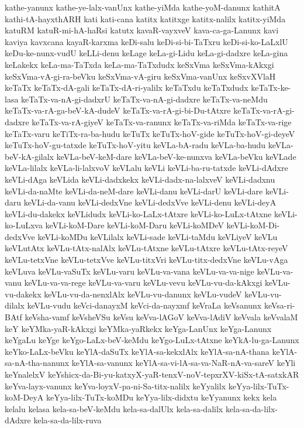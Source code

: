 {kathe-yanunx
kathe-ye-lalx-vanUnx
kathe-yiMda
kathe-yoM-danunx
kathitA
kathi-tA-hayxthARH
kati
kati-cana
katitx
katitxge
katitx-nalilx
katitx-yiMda
katuRM
katuR-mi-hA-haRsi
katutx
kavaR-vayxveV
kava-ca-ga-Lanunx
kavi
kaviya
kavxcana
kayaR-karxma
keDi-salu
keDi-si-bi-TaTxru
keDi-si-ko-LaLxlU
keDu-ke-nunx-vudU
keLLi-denu
keLage
keLa-gi-Lidu
keLa-gi-dadxre
keLa-gina
keLakekx
keLa-ma-TaTxda
keLa-ma-TaTxdudx
keSxVma
keSxVma-kAkxgi
keSxVma-vA-gi-ra-beVku
keSxVma-vA-giru
keSxVma-vanUnx
keSxvXVlaH
keTaTx
keTaTx-dA-gali
keTaTx-dA-ri-yalilx
keTaTxdu
keTaTxdudx
keTaTx-ke-lasa
keTaTx-va-nA-gi-dadxrU
keTaTx-va-nA-gi-dadxre
keTaTx-va-neMdu
keTaTx-va-rA-ga-beV-kA-dudeV
keTaTx-va-rA-gi-bi-Du-tAtxre
keTaTx-va-rA-gi-dadxre
keTaTx-va-rA-giyeV
keTaTx-va-ranunx
keTaTx-va-riMda
keTaTx-va-rige
keTaTx-varu
keTiTx-ra-ba-hudu
keTuTx
keTuTx-hoV-gide
keTuTx-hoV-gi-deyeV
keTuTx-hoV-gu-tatxde
keTuTx-hoV-yitu
keVLa-bA-radu
keVLa-ba-hudu
keVLa-beV-kA-gilalx
keVLa-beV-keM-dare
keVLa-beV-ke-nunxva
keVLa-beVku
keVLade
keVLa-lilalx
keVLa-li-lalxvoV
keVLalu
keVLi
keVLi-ba-ru-tatxde
keVLi-dAdxre
keVLi-dAga
keVLida
keVLi-dadxkekx
keVLi-dadx-na-lalxveV
keVLi-dadxnu
keVLi-da-naMte
keVLi-da-neM-dare
keVLi-danu
keVLi-darU
keVLi-dare
keVLi-daru
keVLi-da-vanu
keVLi-dedxVne
keVLi-dedxVve
keVLi-denu
keVLi-deyA
keVLi-du-dakekx
keVLidudx
keVLi-ko-LaLx-tAtxre
keVLi-ko-LuLx-tAtxne
keVLi-ko-LuLxva
keVLi-koM-Dare
keVLi-koM-Daru
keVLi-koMDeV
keVLi-koM-Di-dedxVve
keVLi-koMDu
keVLilalx
keVLi-sade
keVLi-taMdu
keVLiyeV
keVLu
keVLutAtx
keVLu-tAtx-nalAlx
keVLu-tAtxne
keVLu-tAtxre
keVLu-tAtx-reyeV
keVLu-tetxVne
keVLu-tetxVve
keVLu-titxVri
keVLu-titx-dedxVne
keVLu-vAga
keVLuva
keVLu-vaSuTx
keVLu-varu
keVLu-va-vana
keVLu-va-va-nige
keVLu-va-vanu
keVLu-va-va-rege
keVLu-va-varu
keVLu-vevu
keVLu-vu-da-kAkxgi
keVLu-vu-dakekx
keVLu-vu-da-nenxlAlx
keVLu-vu-danunx
keVLu-vudeV
keVLu-vu-dilalx
keVLu-vudu
keVci-danayxM
keVci-da-nayxmf
keVraLa
keVsanunx
keVsa-ri-BAtf
keVsha-vamf
keVsheVSu
keVsu
keVva-lAGoV
keVva-lAdiV
keVvala
keVvalaM
keY
keYMka-yaR-kAkxgi
keYMka-yaRkekx
keYga-LanUnx
keYga-Lanunx
keYgaLu
keYge
keYgo-LaLx-beV-keMdu
keYgo-LuLx-tAtxne
keYkA-lu-ga-Lanunx
keYko-LaLx-beVku
keYlA-daSuTx
keYlA-sa-kekxlAlx
keYlA-sa-nA-thana
keYlA-sa-nA-tha-nanunx
keYlA-sa-vanunx
keYlA-sa-vi-lA-sa-va-NaR-nA-va-sareV
keYli
keYnalelxV
keYshicx-da-Bi-yu-katxyX-yaR-tenxV-noV-tepxrXV-kiSx-tA-satxkAR
keYva-layx-vanunx
keYva-loyxV-pa-ni-Sa-titx-nalilx
keYyalilx
keYya-lilx-TuTx-koM-DeyA
keYya-lilx-TuTx-koMDu
keYya-lilx-didxtu
keYyanunx
kekx
kela
kelalu
kelasa
kela-sa-beV-keMdu
kela-sa-dalUlx
kela-sa-dalilx
kela-sa-da-lilx-dAdxre
kela-sa-da-lilx-ruva
}
